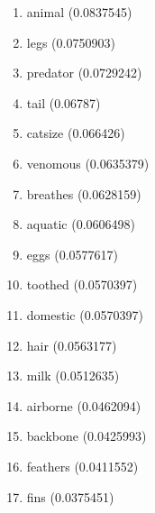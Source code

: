 \begin{enumerate}
\item animal (0.0837545)
\item legs (0.0750903)
\item predator (0.0729242)
\item tail (0.06787)
\item catsize (0.066426)
\item venomous (0.0635379)
\item breathes (0.0628159)
\item aquatic (0.0606498)
\item eggs (0.0577617)
\item toothed (0.0570397)
\item domestic (0.0570397)
\item hair (0.0563177)
\item milk (0.0512635)
\item airborne (0.0462094)
\item backbone (0.0425993)
\item feathers (0.0411552)
\item fins (0.0375451)
\end{enumerate}